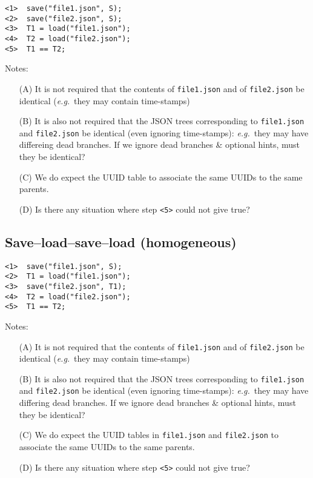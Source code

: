 \documentclass{article}
\newcommand \eg {\textit{e.g.}}
\begin{document}
\begin{verbatim}
<1>  save("file1.json", S);
<2>  save("file2.json", S);
<3>  T1 = load("file1.json");
<4>  T2 = load("file2.json");
<5>  T1 == T2;
\end{verbatim}

Notes:
\begin{itemize}
\item[(A)]  It is not required that the contents of \verb|file1.json| and of
     \verb|file2.json| be identical (\eg~they may contain time-stamps)
\item[(B)]  It is also not required that the JSON trees corresponding to
     \verb|file1.json| and \verb|file2.json| be identical (even ignoring
     time-stamps): \eg~they may have differeing dead branches.  If we ignore
     dead branches {\&} optional hints, must they be identical?
\item[(C)]  We do expect the UUID table to associate the same UUIDs
     to the same parents.
\item[(D)]  Is there any situation where step \verb|<5>| could not give true?
\end{itemize}



\subsection{Save--load--save--load (homogeneous)}

\begin{verbatim}
<1>  save("file1.json", S);
<2>  T1 = load("file1.json");
<3>  save("file2.json", T1);
<4>  T2 = load("file2.json");
<5>  T1 == T2;
\end{verbatim}

Notes:
\begin{itemize}
\item[(A)]  It is not required that the contents of \verb|file1.json| and of
     \verb|file2.json| be identical (\eg~they may contain time-stamps)

\item[(B)]  It is also not required that the JSON trees corresponding to
     \verb|file1.json| and \verb|file2.json| be identical (even ignoring
     time-stamps): \eg~they may have differing dead branches.  If we ignore
     dead branches {\&} optional hints, must they be identical?

\item[(C)]  We do expect the UUID tables in \verb|file1.json| and \verb|file2.json|
     to associate the same UUIDs to the same parents.

\item[(D)]  Is there any situation where step \verb|<5>| could not give true?
\end{itemize}
\end{document}
